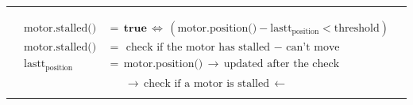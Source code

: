 \documentclass{article}
\begin{document}
    \bigbreak %
    \hrule %
    \bigbreak %

    \begin{align*}
        \text{motor.stalled()}\, &=\, \textbf{true}\, \Leftrightarrow\, (\text{motor.position()} - \text{lastt}_{\text{position}} < \text{threshold}) \\
        \text{motor.stalled()}\, &=\, \text{check if the motor has stalled $-$ can't move} \\
        \text{lastt}_{\text{position}}\, &=\, \text{motor.position()}\, \rightarrow\, \text{updated after the check} \\
    \end{align*}
    \[\rightarrow\, \text{check if a motor is stalled}\, \leftarrow\]
 
    \bigbreak %
    \hrule %
    \bigbreak %

\end{document}
